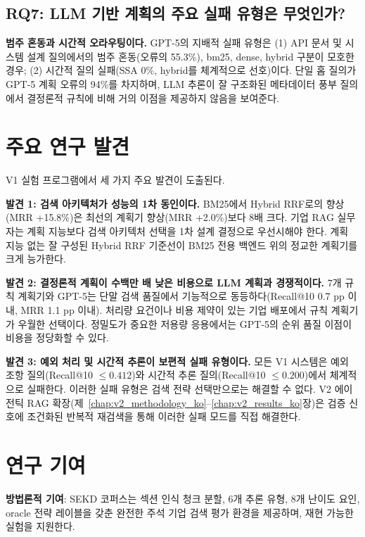 \subsection*{RQ7: LLM 기반 계획의 주요 실패 유형은 무엇인가?}
\textbf{범주 혼동과 시간적 오라우팅이다.} GPT-5의 지배적 실패 유형은 (1) API 문서 및 시스템 설계 질의에서의 범주 혼동(오류의 55.3\%), bm25, dense, hybrid 구분이 모호한 경우; (2) 시간적 질의 실패(SSA 0\%, hybrid를 체계적으로 선호)이다. 단일 홉 질의가 GPT-5 계획 오류의 94\%를 차지하며, LLM 추론이 잘 구조화된 메타데이터 풍부 질의에서 결정론적 규칙에 비해 거의 이점을 제공하지 않음을 보여준다.

\section{주요 연구 발견}
\label{sec:conc_findings_ko}

V1 실험 프로그램에서 세 가지 주요 발견이 도출된다.

\textbf{발견 1: 검색 아키텍처가 성능의 1차 동인이다.} BM25에서 Hybrid RRF로의 향상(MRR +15.8\%)은 최선의 계획기 향상(MRR +2.0\%)보다 8배 크다. 기업 RAG 실무자는 계획 지능보다 검색 아키텍처 선택을 1차 설계 결정으로 우선시해야 한다. 계획 지능 없는 잘 구성된 Hybrid RRF 기준선이 BM25 전용 백엔드 위의 정교한 계획기를 크게 능가한다.

\textbf{발견 2: 결정론적 계획이 수백만 배 낮은 비용으로 LLM 계획과 경쟁적이다.} 7개 규칙 계획기와 GPT-5는 단말 검색 품질에서 기능적으로 동등하다(Recall@10 0.7 pp 이내, MRR 1.1 pp 이내). 처리량 요건이나 비용 제약이 있는 기업 배포에서 규칙 계획기가 우월한 선택이다. 정밀도가 중요한 저용량 응용에서는 GPT-5의 순위 품질 이점이 비용을 정당화할 수 있다.

\textbf{발견 3: 예외 처리 및 시간적 추론이 보편적 실패 유형이다.} 모든 V1 시스템은 예외 조항 질의(Recall@10 $\leq{0.412}$)와 시간적 추론 질의(Recall@10 $\leq{0.200}$)에서 체계적으로 실패한다. 이러한 실패 유형은 검색 전략 선택만으로는 해결할 수 없다. V2 에이전틱 RAG 확장(제~\ref{chap:v2_methodology_ko}--\ref{chap:v2_results_ko}장)은 검증 신호에 조건화된 반복적 재검색을 통해 이러한 실패 모드를 직접 해결한다.

\section{연구 기여}
\label{sec:conc_contributions_ko}

\textbf{방법론적 기여}: SEKD 코퍼스는 섹션 인식 청크 분할, 6개 추론 유형, 8개 난이도 요인, oracle 전략 레이블을 갖춘 완전한 주석 기업 검색 평가 환경을 제공하며, 재현 가능한 실험을 지원한다.

